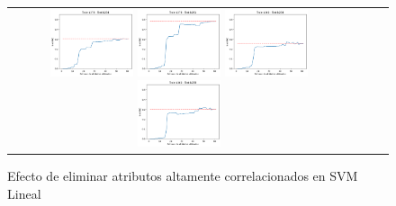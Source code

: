 \begin{figure}[h!]
\begin{tabular}{cccc}
\includegraphics[width=0.25\textwidth]{Kap6/pearson_linear_INDIVIDUAL_CURVES_train=b278test=b234}  \includegraphics[width=0.25\textwidth]{Kap6/pearson_linear_INDIVIDUAL_CURVES_train=b278test=b261} 
 \includegraphics[width=0.25\textwidth]{Kap6/pearson_linear_INDIVIDUAL_CURVES_train=b360test=b234}  \includegraphics[width=0.25\textwidth]{Kap6/pearson_linear_INDIVIDUAL_CURVES_train=b360test=b278} 
\end{tabular}
\caption{Efecto de eliminar atributos altamente correlacionados en SVM Lineal}
\label{fig:svml_correlation_remove}
\end{figure}

